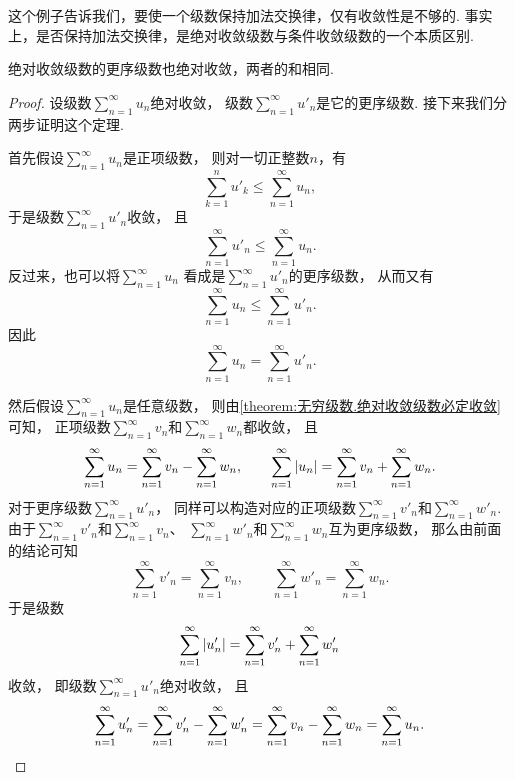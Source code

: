 这个例子告诉我们，要使一个级数保持加法交换律，仅有收敛性是不够的.
事实上，是否保持加法交换律，是绝对收敛级数与条件收敛级数的一个本质区别.

\begin{theorem}[绝对收敛级数的可交换性]\label{theorem:无穷级数.绝对收敛级数的可交换性}
绝对收敛级数的更序级数也绝对收敛，两者的和相同.
\begin{proof}
设级数\(\sum_{n=1}^\infty u_n\)绝对收敛，
级数\(\sum_{n=1}^\infty u'_n\)是它的更序级数.
接下来我们分两步证明这个定理.

首先假设\(\sum_{n=1}^\infty u_n\)是正项级数，
则对一切正整数\(n\)，有\begin{equation*}
	\sum_{k=1}^n u'_k
	\leq \sum_{n=1}^\infty u_n,
\end{equation*}
于是级数\(\sum_{n=1}^\infty u'_n\)收敛，
且\begin{equation*}
	\sum_{n=1}^\infty u'_n
	\leq \sum_{n=1}^\infty u_n.
\end{equation*}
反过来，也可以将\(\sum_{n=1}^\infty u_n\)
看成是\(\sum_{n=1}^\infty u'_n\)的更序级数，
从而又有\begin{equation*}
	\sum_{n=1}^\infty u_n
	\leq \sum_{n=1}^\infty u'_n.
\end{equation*}
因此\begin{equation*}
	\sum_{n=1}^\infty u_n
	= \sum_{n=1}^\infty u'_n.
\end{equation*}

然后假设\(\sum_{n=1}^\infty u_n\)是任意级数，
则由\cref{theorem:无穷级数.绝对收敛级数必定收敛} 可知，
正项级数\(\sum_{n=1}^\infty v_n\)和\(\sum_{n=1}^\infty w_n\)都收敛，
且\begin{equation*}
	\sum_{n=1}^\infty u_n
	= \sum_{n=1}^\infty v_n
	- \sum_{n=1}^\infty w_n,
	\qquad
	\sum_{n=1}^\infty \abs{u_n}
	= \sum_{n=1}^\infty v_n
	+ \sum_{n=1}^\infty w_n.
\end{equation*}
对于更序级数\(\sum_{n=1}^\infty u'_n\)，
同样可以构造对应的正项级数\(\sum_{n=1}^\infty v'_n\)和\(\sum_{n=1}^\infty w'_n\).
由于\(\sum_{n=1}^\infty v'_n\)和\(\sum_{n=1}^\infty v_n\)、
\(\sum_{n=1}^\infty w'_n\)和\(\sum_{n=1}^\infty w_n\)互为更序级数，
那么由前面的结论可知\begin{equation*}
	\sum_{n=1}^\infty v'_n
	= \sum_{n=1}^\infty v_n,
	\qquad
	\sum_{n=1}^\infty w'_n
	= \sum_{n=1}^\infty w_n.
\end{equation*}
于是级数\begin{equation*}
	\sum_{n=1}^\infty \abs{u'_n}
	= \sum_{n=1}^\infty v'_n
	+ \sum_{n=1}^\infty w'_n
\end{equation*}收敛，
即级数\(\sum_{n=1}^\infty u'_n\)绝对收敛，
且\begin{equation*}
	\sum_{n=1}^\infty u'_n
	= \sum_{n=1}^\infty v'_n
	- \sum_{n=1}^\infty w'_n
	= \sum_{n=1}^\infty v_n
	- \sum_{n=1}^\infty w_n
	= \sum_{n=1}^\infty u_n.
	\qedhere
\end{equation*}
\end{proof}
\end{theorem}

